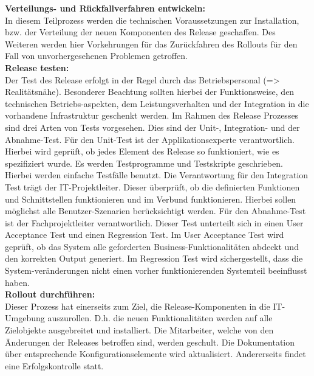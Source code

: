 \textbf{Verteilungs- und Rückfallverfahren entwickeln:}
\\
In diesem Teilprozess werden die technischen Voraussetzungen zur Installation, bzw. der Verteilung der neuen Komponenten des Release geschaffen. Des Weiteren werden hier Vorkehrungen für das Zurückfahren des Rollouts für den Fall von unvorhergesehenen Problemen getroffen. 
\\
\textbf{Release testen:}
\\
Der Test des Release erfolgt in der Regel durch das Betriebspersonal (=> Realitätsnähe). Besonderer Beachtung sollten hierbei der Funktionsweise, den technischen Betriebs-aspekten, dem Leistungsverhalten und der Integration in die vorhandene Infrastruktur geschenkt werden.  
Im Rahmen des Release Prozesses sind drei Arten von Tests vorgesehen. Dies sind der Unit-, Integration- und der Abnahme-Test.  
Für den Unit-Test ist der Applikationsexperte verantwortlich. Hierbei wird geprüft, ob jedes Element des Release so funktioniert, wie es spezifiziert wurde. Es werden Testprogramme und Testskripte geschrieben. Hierbei werden einfache Testfälle benutzt. 
Die Verantwortung für den Integration Test trägt der IT-Projektleiter. Dieser überprüft, ob die definierten Funktionen und Schnittstellen funktionieren und im Verbund funktionieren. Hierbei sollen möglichst alle Benutzer-Szenarien berücksichtigt werden. 
Für den Abnahme-Test ist der Fachprojektleiter verantwortlich. Dieser Test unterteilt sich in einen User Acceptance Test und einen Regression Test. Im User Acceptance Test wird geprüft, ob das System alle geforderten Business-Funktionalitäten abdeckt und den korrekten Output generiert. Im Regression Test wird sichergestellt, dass die System-veränderungen nicht einen vorher funktionierenden Systemteil beeinflusst haben. 
\\
\textbf{Rollout durchführen:}
\\
Dieser Prozess hat einerseits zum Ziel, die Release-Komponenten in die IT-Umgebung auszurollen. D.h. die neuen Funktionalitäten werden auf alle Zielobjekte ausgebreitet und installiert. Die Mitarbeiter, welche von den Änderungen der Releases betroffen sind, werden geschult. Die Dokumentation über entsprechende Konfigurationselemente wird aktualisiert.  Andererseits findet eine Erfolgskontrolle statt. 
